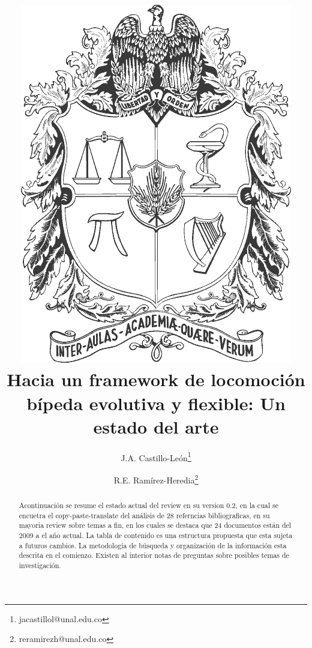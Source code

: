 \documentclass[10pt,onecolumn,twoside,letterpaper]{article}
\title{\vspace{-0.8cm}\includegraphics[scale=0.12]{../../images/unescudobn.png}\\\vspace{-0.0cm}
  \LARGE \textbf{Hacia un framework de locomoci\'on b\'ipeda evolutiva y flexible: Un estado del arte}}
\author{J.A. Castillo-Le\'on\thanks{jacastillol@unal.edu.co} \and R.E. Ram\'irez-Heredia\thanks{reramirezh@unal.edu.co}}
\date{}
\begin{document}
\maketitle
\begin{abstract}\small
  Acontinuaci\'on se resume el estado actual del review en su version 0.2, en la cual se encuetra el copy-paste-translate del an\'alisis de 28 referncias bibliograficas, en su mayoria review sobre temas a fin, en los cuales se destaca que 24 documentos est\'an del 2009 a el a\~no actual. La tabla de contenido es una estructura propuesta que esta sujeta a futuros cambios. La metodolog\'ia de b\'usqueda y organizaci\'on de la informaci\'on esta descrita en el comienzo. Existen al interior notas de preguntas sobre posibles temas de investigaci\'on.
\end{abstract}
\begin{multicols}{2}\small
\tableofcontents
\end{multicols}
\newpage
\end{document}
